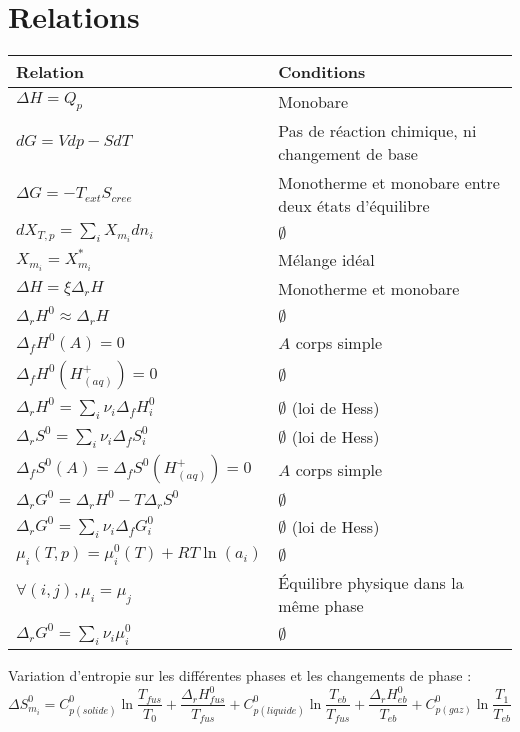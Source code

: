 \documentclass[12pt,a4paper] {article}
\begin{document}
\section{Relations}
\begin{tabularx}{\linewidth}{|l|X|} \hline
    \bf{Relation}    & \bf{Conditions} \\ \hline
    $\Delta H = Q_p$ & Monobare \\ \hline
    $dG = Vdp - SdT$ & Pas de réaction chimique, ni changement de base \\ \hline
    $\Delta G = -T_{ext}S_{cree}$ & Monotherme et monobare entre deux états d'équilibre \\ \hline
    $dX_{T,p} = \sum_i X_{m_i}dn_i$ & $\emptyset$ \\ \hline
    $X_{m_i} = X_{m_i}^*$ & Mélange idéal \\ \hline
    $\Delta H = \xi \Delta_r H$ & Monotherme et monobare \\ \hline
    $\Delta_r H^0 \approx \Delta_r H$ & $\emptyset$ \\ \hline
    $\Delta_f H^0(A) = 0$ & $A$ corps simple \\ \hline
    $\Delta_f H^0(H^+_{(aq)}) = 0$ & $\emptyset$ \\ \hline
    $\Delta_r H^0 = \sum_i \nu_i \Delta_f H_i^0$ & $\emptyset$ (loi de Hess) \\ \hline
    $\Delta_r S^0 = \sum_i \nu_i \Delta_f S_i^0$ & $\emptyset$ (loi de Hess) \\ \hline
    $\Delta_f S^0(A) = \Delta_f S^0(H^+_{(aq)}) = 0$ & $A$ corps simple \\ \hline
    $\Delta_r G^0 = \Delta_r H^0 - T\Delta_r S^0$ & $\emptyset$ \\ \hline
    $\Delta_r G^0 = \sum_i \nu_i\Delta_f G_i^0$ & $\emptyset$ (loi de Hess) \\ \hline
    $\mu_i(T,p) = \mu_i^0(T) + RT\ln(a_i)$ & $\emptyset$ \\ \hline
    $\forall (i,j), \mu_i = \mu_j$ & Équilibre physique dans la même phase \\ \hline
    $\Delta_r G^0 = \sum_i \nu_i\mu_i^0$ & $\emptyset$ \\ \hline
\end{tabularx}

Variation d'entropie sur les différentes phases et les changements de phase :
\[ \Delta S_{m_i}^0 = C_{p(solide)}^0\ln\frac{T_{fus}}{T_0} + \frac{\Delta_r H_{fus}^0}{T_{fus}} + C_{p(liquide)}^0\ln\frac{T_{eb}}{T_{fus}} + \frac{\Delta_r H_{eb}^0}{T_{eb}} + C_{p(gaz)}^0\ln\frac{T_1}{T_{eb}} \]
\end{document}
